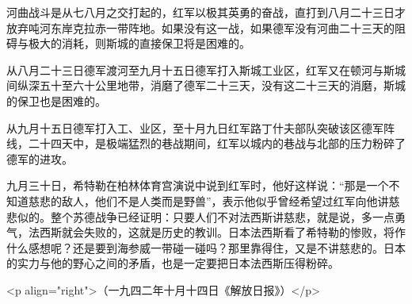 河曲战斗是从七八月之交打起的，红军以极其英勇的奋战，直打到八月二十三日才放弃吨河东岸克拉赤一带阵地。如果没有这一战，如果德军没有河曲二十三天的阻碍与极大的消耗，则斯城的直接保卫将是困难的。

从八月二十三日德军渡河至九月十五日德军打入斯城工业区，红军又在顿河与斯城间纵深五十至六十公里地带，消磨了德军二十三天，没有这二十三天的消磨，斯城的保卫也是困难的。


从九月十五日德军打入工、业区，至十月九日红军路丁什夫部队突破该区德军阵线，二十四天中，是极端猛烈的巷战期间，红军以城内的巷战与北部的压力粉碎了德军的进攻。

九月三十日，希特勒在柏林体育宫演说中说到红军时，他好这样说：“那是一个不知道慈悲的敌人，他们不是人类而是野兽”，表示他似乎曾经希望过红军向他讲慈悲似的。整个苏德战争已经证明：只要人们不对法西斯讲慈悲，就是说，多一点勇气，法西斯就会失败的，这就是历史的教训。日本法西斯看了希特勒的惨败，将作什么感想呢？还是要到海参威一带碰一碰吗？那里靠得住，又是不讲慈悲的。日本的实力与他的野心之间的矛盾，也是一定要把日本法西斯压得粉碎。

<p align="right">（一九四二年十月十四日《解放日报》）</p>


